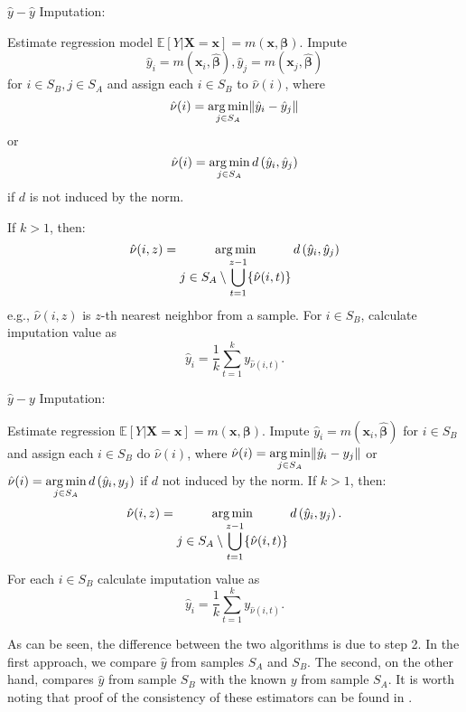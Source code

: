 \documentclass[
]{jss}
\begin{document}
\begin{algorithm}[H]
\caption{$\hat{y}-\hat{y}$ Imputation:}
\label{algo-3}
\begin{algorithmic}[1]
\State Estimate regression model $\mathbb{E}[Y|\boldsymbol{X}=\boldsymbol{x}]=m(\boldsymbol{x}, \boldsymbol{\beta})$.\;
\State Impute $$\hat{y}_{i}=m\left(\boldsymbol{x}_{i},\hat{\boldsymbol{\beta}}\right), 
\hat{y}_{j}=m\left(\boldsymbol{x}_{j},\hat{\boldsymbol{\beta}}\right)$$
for $i\in S_{B}, j\in S_{A}$ and assign each 
$i\in S_{B}$ to $\hat{\nu}(i)$, where
$$\displaystyle \hat{\nu}(i)=
\operatornamewithlimits{arg\,min}_{j\in S_{A}}\lVert \hat{y}_{i}-\hat{y}_{j}\rVert$$ or
$$\displaystyle \hat{\nu}(i)=
\operatornamewithlimits{arg\,min}_{j\in S_{A}}d\left(\hat{y}_{i},\hat{y}_{j}\right)$$ if $d$ is not induced by the norm.\;

\State If $k>1$, then:
$$\hat{\nu}(i, z) = \operatornamewithlimits{arg\,min}_{\displaystyle j\in S_{A}\setminus\bigcup_{t=1}^{z-1}
\{\hat{\nu}(i, t)\}} d\left(\hat{y}_{i},\hat{y}_{j}\right)$$
e.g., $\hat{\nu}(i, z)$ is $z$-th nearest neighbor from a sample.\;
\State For $i \in S_B$, calculate imputation value as 
$$
\hat{y}_i = \frac{1}{k}\sum_{t=1}^{k}y_{\hat{\nu}(i, t)}.
$$
\end{algorithmic}
\end{algorithm}

\begin{algorithm}[H]
\caption{$\hat{y}-y$ Imputation:}
\label{algo-4}
\begin{algorithmic}[1]
\State Estimate regression $\mathbb{E}[Y|\boldsymbol{X}=\boldsymbol{x}]=m(\boldsymbol{x}, \boldsymbol{\beta})$.\;
\State Impute $\hat{y}_{i}=m\left(\boldsymbol{x}_{i},\hat{\boldsymbol{\beta}}\right)$ 
for $i \in S_{B}$ and assign each 
$i \in S_{B}$ do $\hat{\nu}(i)$, where
$\displaystyle \hat{\nu}(i)=
\operatornamewithlimits{arg\,min}_{j \in S_{A}}\lVert \hat{y}_{i}-y_{j}\rVert$ or
$\displaystyle \hat{\nu}(i)=
\operatornamewithlimits{arg\,min}_{j \in S_{A}}d\left(\hat{y}_{i},y_{j}\right)$ 
if $d$ not induced by the norm.\;
\State If $k>1$, then:
$$\hat{\nu}(i, z) = \operatornamewithlimits{arg\,min}_{\displaystyle j \in S_{A} \setminus \bigcup_{t=1}^{z-1}
\{\hat{\nu}(i, t)\}}
d\left(\hat{y}_{i},y_{j}\right).$$
\State For each $i \in S_B$ calculate imputation value as
$$
\hat{y}_i = \frac{1}{k}\sum_{t=1}^{k}y_{\hat{\nu}(i, t)}.
$$
\end{algorithmic}
\end{algorithm}

As can be seen, the difference between the two algorithms is due to step
2. In the first approach, we compare \(\hat{y}\) from samples \(S_A\)
and \(S_B\). The second, on the other hand, compares \(\hat{y}\) from
sample \(S_B\) with the known \(y\) from sample \(S_A\). It is worth
noting that proof of the consistency of these estimators can be found in
\citet{Beres}.
\end{document}
